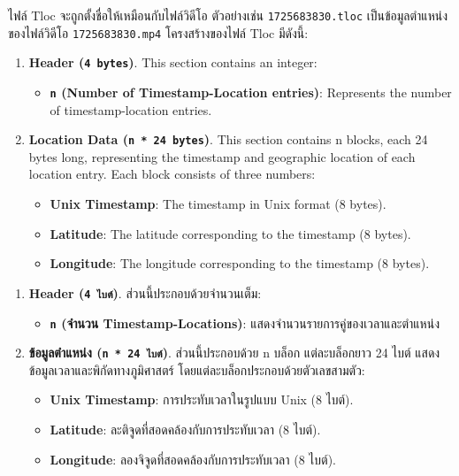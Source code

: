 ไฟล์ Tloc จะถูกตั้งชื่อให้เหมือนกับไฟล์วิดีโอ ตัวอย่างเช่น \texttt{1725683830.tloc} เป็นข้อมูลตำแหน่งของไฟล์วิดีโอ \texttt{1725683830.mp4} โครงสร้างของไฟล์ Tloc มีดังนี้:
\fi

\ifenglish
\begin{enumerate}
    \item \textbf{Header (\texttt{4 bytes})}. This section contains an integer:
    \begin{itemize}
        \item \textbf{\texttt{n} (Number of Timestamp-Location entries)}: Represents the number of timestamp-location entries.
    \end{itemize}
    
    \item \textbf{Location Data (\texttt{n * 24 bytes})}. This section contains n blocks, each 24 bytes long, representing the timestamp and geographic location of each location entry. Each block consists of three numbers:
    \begin{itemize}
        \item \textbf{Unix Timestamp}: The timestamp in Unix format (8 bytes).
        \item \textbf{Latitude}: The latitude corresponding to the timestamp (8 bytes).
        \item \textbf{Longitude}: The longitude corresponding to the timestamp (8 bytes).
    \end{itemize}
\end{enumerate}
\else
\begin{enumerate}
    \item \textbf{Header (\texttt{4 ไบต์})}. ส่วนนี้ประกอบด้วยจำนวนเต็ม:
    \begin{itemize}
        \item \textbf{\texttt{n} (จำนวน Timestamp-Locations)}: แสดงจำนวนรายการคู่ของเวลาและตำแหน่ง
    \end{itemize}
    
    \item \textbf{ข้อมูลตำแหน่ง (\texttt{n * 24 ไบต์})}. ส่วนนี้ประกอบด้วย n บล็อก แต่ละบล็อกยาว 24 ไบต์ แสดงข้อมูลเวลาและพิกัดทางภูมิศาสตร์ โดยแต่ละบล็อกประกอบด้วยตัวเลขสามตัว:
    \begin{itemize}
        \item \textbf{Unix Timestamp}: การประทับเวลาในรูปแบบ Unix (8 ไบต์).
        \item \textbf{Latitude}: ละติจูดที่สอดคล้องกับการประทับเวลา (8 ไบต์).
        \item \textbf{Longitude}: ลองจิจูดที่สอดคล้องกับการประทับเวลา (8 ไบต์).
    \end{itemize}
\end{enumerate}
\fi

